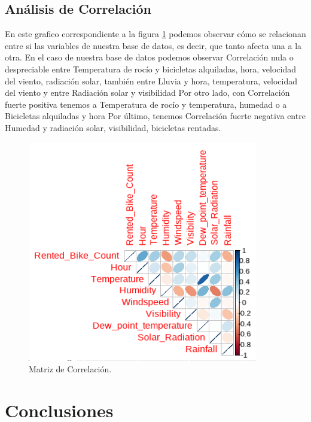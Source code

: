 \documentclass[]{elsarticle} %
\begin{document}
\subsection{Análisis de Correlación}

En este grafico correspondiente a la figura \ref{fig:fig8} podemos
observar cómo se relacionan entre si las variables de nuestra base de
datos, es decir, que tanto afecta una a la otra. En el caso de nuestra
base de datos podemos observar Correlación nula o despreciable entre
Temperatura de rocío y bicicletas alquiladas, hora, velocidad del
viento, radiación solar, también entre Lluvia y hora, temperatura,
velocidad del viento y entre Radiación solar y visibilidad Por otro
lado, con Correlación fuerte positiva tenemos a Temperatura de rocío y
temperatura, humedad o a Bicicletas alquiladas y hora Por último,
tenemos Correlación fuerte negativa entre Humedad y radiación solar,
visibilidad, bicicletas rentadas.

\begin{figure}[H]

{\centering \includegraphics[width=1\linewidth]{corr} 

}

\caption{\label{fig:fig8}Matriz de Correlación.}\label{fig:fig8}
\end{figure}
\newpage
\section{Conclusiones}
\end{document}
